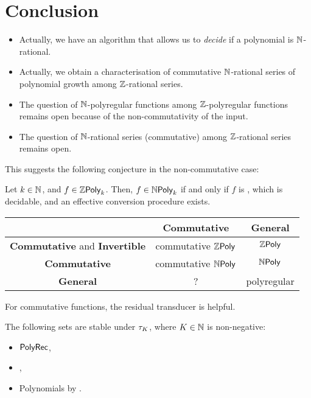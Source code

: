 \section{Conclusion}
\label{sec:ccl}

\begin{itemize}
    \item Actually, we have an algorithm that allows
        us to \emph{decide} if a polynomial is $\mathbb{N}$-rational.
    \item Actually, we obtain a characterisation of
        commutative 
        $\mathbb{N}$-rational series of polynomial growth
        among $\mathbb{Z}$-rational series.
    \item The question of $\mathbb{N}$-polyregular functions
        among $\mathbb{Z}$-polyregular functions remains open
        because of the non-commutativity of the input.
    \item The question of $\mathbb{N}$-rational series (commutative)
        among $\mathbb{Z}$-rational series remains open.
\end{itemize}

 This suggests the
following conjecture in the non-commutative case:

\begin{conjecture}
    Let $k \in \mathbb{N}$,
    and $f \in \ZPoly[k]$. Then, $f \in \NPoly[k]$
    if and only if $f$ is , which is decidable,
    and an effective conversion procedure exists.
\end{conjecture}


\begin{center}
    \begin{tabular}{c|cc}
        \toprule
        & \textbf{Commutative} & \textbf{General} \\
        \midrule
        \textbf{Commutative}
        and \textbf{Invertible} & commutative $\ZPoly$ & $\ZPoly$ \\
        \textbf{Commutative} & commutative $\NPoly$ & $\NPoly$ \\
        \textbf{General} & ? & polyregular 
    \end{tabular}
\end{center}


\begin{conjecture}
    For commutative functions, the residual transducer 
    is helpful.
\end{conjecture}

\begin{fact}
    \label{translation-invariance:fact}
    The following sets are stable under 
    $\tau_{K}$,
    where $K \in \mathbb{N}$ is non-negative:
    \begin{itemize}
        \item $\mathsf{PolyRec}$,
        \item {},
        \item Polynomials 
            by .
    \end{itemize}
\end{fact}


